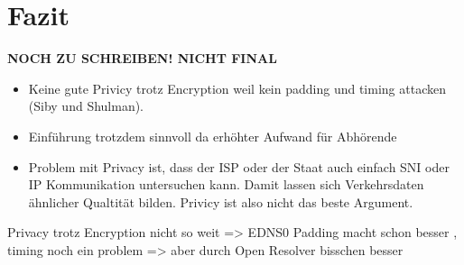 \chapter{Fazit}

\textbf{NOCH ZU SCHREIBEN! NICHT FINAL}

\begin{itemize}
    \item Keine gute Privicy trotz Encryption weil kein padding und timing attacken (Siby und Shulman). 
    \item Einführung trotzdem sinnvoll da erhöhter Aufwand für Abhörende 
    \item Problem mit Privacy ist, dass der ISP oder der Staat auch einfach SNI oder IP Kommunikation untersuchen kann. Damit lassen sich Verkehrsdaten ähnlicher Qualtität bilden. Privicy ist also nicht das beste Argument.
\end{itemize}

Privacy trotz Encryption nicht so weit \cite{Shulman2014} \cite{Siby2018} => EDNS0 Padding macht schon besser \cite{rfc7830}, timing noch ein problem => aber durch Open Resolver bisschen besser\cite{Shulman2014}
    